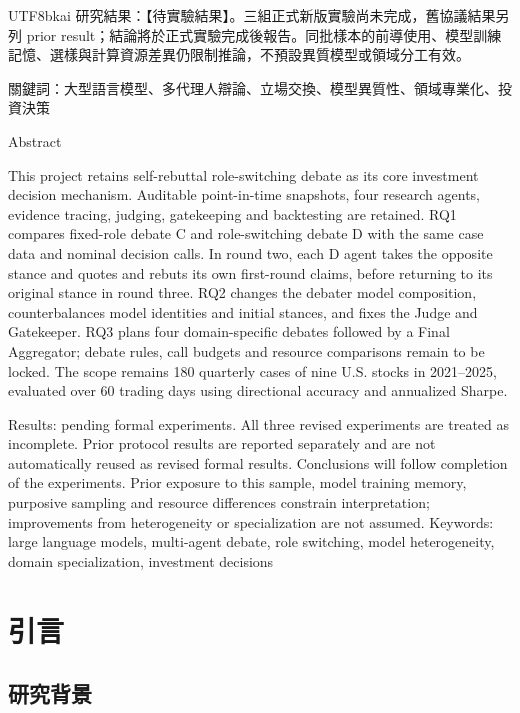 \documentclass[12pt,a4paper]{article}
\begin{document}
\begin{CJK}{UTF8}{bkai}
研究結果：【待實驗結果】。三組正式新版實驗尚未完成，舊協議結果另列 prior result；結論將於正式實驗完成後報告。同批樣本的前導使用、模型訓練記憶、選樣與計算資源差異仍限制推論，不預設異質模型或領域分工有效。

\vspace{0.6cm}
\noindent 關鍵詞：大型語言模型、多代理人辯論、立場交換、模型異質性、領域專業化、投資決策
\clearpage
\begin{center}{\fontsize{16}{24}\selectfont Abstract\par}\end{center}
\noindent This project retains self-rebuttal role-switching debate as its core investment decision mechanism. Auditable point-in-time snapshots, four research agents, evidence tracing, judging, gatekeeping and backtesting are retained. RQ1 compares fixed-role debate C and role-switching debate D with the same case data and nominal decision calls. In round two, each D agent takes the opposite stance and quotes and rebuts its own first-round claims, before returning to its original stance in round three. RQ2 changes the debater model composition, counterbalances model identities and initial stances, and fixes the Judge and Gatekeeper. RQ3 plans four domain-specific debates followed by a Final Aggregator; debate rules, call budgets and resource comparisons remain to be locked. The scope remains 180 quarterly cases of nine U.S. stocks in 2021--2025, evaluated over 60 trading days using directional accuracy and annualized Sharpe.

\noindent Results: pending formal experiments. All three revised experiments are treated as incomplete. Prior protocol results are reported separately and are not automatically reused as revised formal results. Conclusions will follow completion of the experiments. Prior exposure to this sample, model training memory, purposive sampling and resource differences constrain interpretation; improvements from heterogeneity or specialization are not assumed.
\vspace{0.6cm}
\noindent Keywords: large language models, multi-agent debate, role switching, model heterogeneity, domain specialization, investment decisions
\clearpage
\tableofcontents
\clearpage
{}

\section{引言}

\subsection{研究背景}


\end{CJK}
\end{document}

